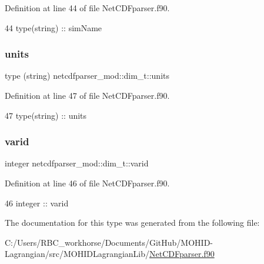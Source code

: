 Definition at line 44 of file Net\+C\+D\+Fparser.\+f90.


\begin{DoxyCode}
44         \textcolor{keywordtype}{type}(string) :: simName
\end{DoxyCode}
\mbox{\label{structnetcdfparser__mod_1_1dim__t_a42d4e5dd93905b5b6912dd7675d0e1db}} 
\subsubsection{\texorpdfstring{units}{units}}
{\footnotesize\ttfamily type (string) netcdfparser\+\_\+mod\+::dim\+\_\+t\+::units\hspace{0.3cm}{\ttfamily [private]}}



Definition at line 47 of file Net\+C\+D\+Fparser.\+f90.


\begin{DoxyCode}
47         type(string) :: units
\end{DoxyCode}
\mbox{\label{structnetcdfparser__mod_1_1dim__t_a850c5b53b1fa2c09e19ee37896065897}} 
\subsubsection{\texorpdfstring{varid}{varid}}
{\footnotesize\ttfamily integer netcdfparser\+\_\+mod\+::dim\+\_\+t\+::varid\hspace{0.3cm}{\ttfamily [private]}}



Definition at line 46 of file Net\+C\+D\+Fparser.\+f90.


\begin{DoxyCode}
46         \textcolor{keywordtype}{integer} :: varid
\end{DoxyCode}


The documentation for this type was generated from the following file\+:\begin{DoxyCompactItemize}
\item 
C\+:/\+Users/\+R\+B\+C\+\_\+workhorse/\+Documents/\+Git\+Hub/\+M\+O\+H\+I\+D-\/\+Lagrangian/src/\+M\+O\+H\+I\+D\+Lagrangian\+Lib/\mbox{\hyperlink{_net_c_d_fparser_8f90}{Net\+C\+D\+Fparser.\+f90}}\end{DoxyCompactItemize}

